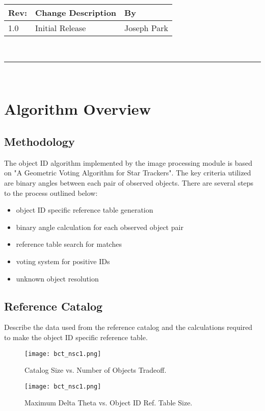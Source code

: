 \documentclass[]{DINOReportMemo}
\begin{document}
\makeCover


%
%
\pagestyle{empty}
{\renewcommand{\arraystretch}{2}
\noindent
\begin{longtable}{|p{0.5in}|p{4.5in}|p{1.14in}|}
\hline
{\bfseries Rev}: & {\bfseries Change Description} & {\bfseries By} \\
\hline
1.0 & Initial Release &  Joseph Park\\ %
\hline

\end{longtable}
}

\newpage
\setcounter{page}{1}
\pagestyle{fancy}

\tableofcontents
~\\ \hrule ~\\

\newpage
\section{Algorithm Overview}
\subsection{Methodology} The object ID algorithm implemented by the image processing module is based on "A Geometric Voting Algorithm for Star Trackers". The key criteria utilized are binary angles between each pair of observed objects. There are several steps to the process outlined below:
\begin{itemize}
  \item object ID specific reference table generation
  \item binary angle calculation for each observed object pair
  \item reference table search for matches
  \item voting system for positive IDs
  \item unknown object resolution\\
\end{itemize}

\subsection{Reference Catalog} Describe the data used from the reference catalog and the calculations required to make the object ID specific reference table. \\ 
\begin{figure}[H]
  \begin{center}
  \texttt{[image: bct\_nsc1.png]}
  \caption{Catalog Size vs. Number of Objects Tradeoff.}
  \label{fig:boat1}
  \end{center}
\end{figure}
\begin{figure}[H]
  \begin{center}
  \texttt{[image: bct\_nsc1.png]}
  \caption{Maximum Delta Theta vs. Object ID Ref. Table Size.}
  \label{fig:boat1}
  \end{center}
\end{figure}
\end{document}
